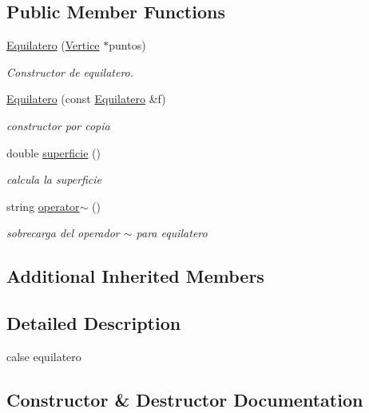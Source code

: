 \subsection*{Public Member Functions}
\begin{DoxyCompactItemize}
\item 
\hyperlink{class_equilatero_a27bc291f53fa7dfa9a4cc3617bca5ecf}{Equilatero} (\hyperlink{class_vertice}{Vertice} $\ast$puntos)
\begin{DoxyCompactList}\small\item\em Constructor de equilatero. \end{DoxyCompactList}\item 
\hyperlink{class_equilatero_a57d43b4311c0016b838ad9796e9162b4}{Equilatero} (const \hyperlink{class_equilatero}{Equilatero} \&f)
\begin{DoxyCompactList}\small\item\em constructor por copia \end{DoxyCompactList}\item 
\mbox{\label{class_equilatero_a16d707c455bde08915f06eeff3a98a99}} 
double \hyperlink{class_equilatero_a16d707c455bde08915f06eeff3a98a99}{superficie} ()
\begin{DoxyCompactList}\small\item\em calcula la superficie \end{DoxyCompactList}\item 
\mbox{\label{class_equilatero_a1e103b1d16b785da9a8b43b17739ad7a}} 
string \hyperlink{class_equilatero_a1e103b1d16b785da9a8b43b17739ad7a}{operator$\sim$} ()
\begin{DoxyCompactList}\small\item\em sobrecarga del operador $\sim$ para equilatero \end{DoxyCompactList}\end{DoxyCompactItemize}
\subsection*{Additional Inherited Members}


\subsection{Detailed Description}
calse equilatero 

\subsection{Constructor \& Destructor Documentation}
\mbox{\label{class_equilatero_a27bc291f53fa7dfa9a4cc3617bca5ecf}} 
